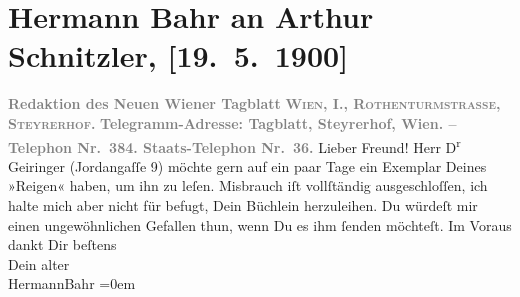 

         
         \renewcommand{\erwaehntePersonen}{Personen: Friedrich Geiringer}
         \renewcommand{\erwaehnteInstitutionen}{Institutionen: Neues Wiener Tagblatt}
         \renewcommand{\erwaehnteOrte}{Orte: Jordangasse, Steyrerhof, Wien}
         \renewcommand{\erwaehnteWerke}{Werke: Reigen. Zehn Dialoge}
               \section[Hermann Bahr an Arthur Schnitzler, {[}19. 5. 1900{]}]{ Hermann Bahr an Arthur Schnitzler, {[}19. 5. 1900{]}}\nopagebreak{}\rehead{ }\begin{ledgroupsized}[t]{13cm}\normalsize\beginnumbering \toendnotes[C]{\smallbreak\pagebreak[2]} 
\pstart
           \noindent{}\centering{}{\pb}\textcolor{gray}{\textbf{Redaktion des Neuen Wiener Tagblatt}}\pend
           \pstart
           \noindent{}\centering{}\textcolor{gray}{\textbf{\textsc{Wien, I., Rothenturmstrasse,
                        Steyrerhof.}}}\pend
           \pstart
           \noindent{}\centering{}\textcolor{gray}{\textbf{Telegramm-Adresse: Tagblatt, Steyrerhof, Wien. –
                     Telephon Nr. 384. Staats-Telephon Nr. 36.}}\pend
           \pstart\center{}Lieber Freund!\pend\pstart
           Herr D\textsuperscript{r}{ }Geiringer (Jordangaſſe 9) möchte gern auf ein paar Tage ein Exemplar Deines »Reigen« haben, um ihn zu leſen. Misbrauch iſt
               vollſtändig ausgeschloſſen, ich halte mich aber nicht für befugt, Dein Büchlein
               herzuleihen. Du würdeſt mir einen ungewöhnlichen Gefallen thun, wenn Du es ihm ſenden
               möchteſt.\pend
           \pstart
           Im Voraus dankt Dir beſtens{\\[\baselineskip]}Dein alter{\\[\baselineskip]}\spacefill\mbox{HermannBahr}\pend
           \leftskip=0em{}
         

\end{ledgroupsized}
